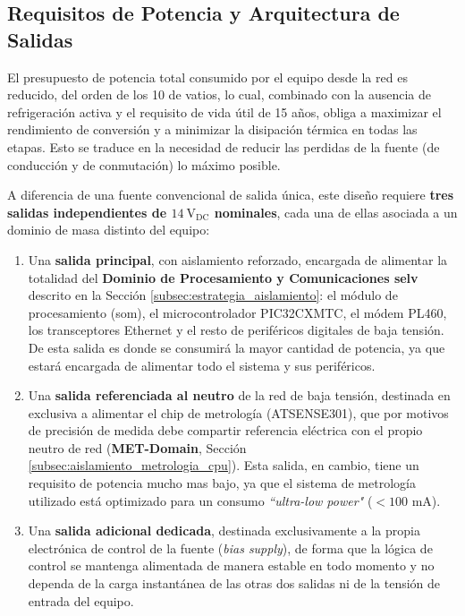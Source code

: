 \subsection{Requisitos de Potencia y Arquitectura de Salidas}
\label{subsec:requisitos_salidas_psu}

El presupuesto de potencia total consumido por el equipo desde la red es reducido, del orden de los 10 de vatios, lo cual, combinado con la ausencia de refrigeración activa y el requisito de vida útil de 15 años, obliga a maximizar el rendimiento de conversión y a minimizar la disipación térmica en todas las etapas. Esto se traduce en la necesidad de reducir las perdidas de la fuente (de conducción y de conmutación) lo máximo posible.

A diferencia de una fuente convencional de salida única, este diseño requiere \textbf{tres salidas independientes de $14\ \text{V}_{\text{DC}}$ nominales}, cada una de ellas asociada a un dominio de masa distinto del equipo:

\begin{enumerate}
    \item Una \textbf{salida principal}, con aislamiento reforzado, encargada de alimentar la totalidad del \textbf{Dominio de Procesamiento y Comunicaciones \gls{selv}} descrito en la Sección \ref{subsec:estrategia_aislamiento}: el módulo de procesamiento (\gls{som}), el microcontrolador PIC32CXMTC, el módem PL460, los transceptores Ethernet y el resto de periféricos digitales de baja tensión. De esta salida es donde se consumirá la mayor cantidad de potencia, ya que estará encargada de alimentar todo el sistema y sus periféricos.
    \item Una \textbf{salida referenciada al neutro} de la red de baja tensión, destinada en exclusiva a alimentar el chip de metrología (ATSENSE301), que por motivos de precisión de medida debe compartir referencia eléctrica con el propio neutro de red (\textbf{MET-Domain}, Sección \ref{subsec:aislamiento_metrologia_cpu}). Esta salida, en cambio, tiene un requisito de potencia mucho mas bajo, ya que el sistema de metrología utilizado está optimizado para un consumo \textit{``ultra-low power"} ($<100\text{ mA}$).
    \item Una \textbf{salida adicional dedicada}, destinada exclusivamente a la propia electrónica de control de la fuente (\textit{bias supply}), de forma que la lógica de control se mantenga alimentada de manera estable en todo momento y no dependa de la carga instantánea de las otras dos salidas ni de la tensión de entrada del equipo.
\end{enumerate}

